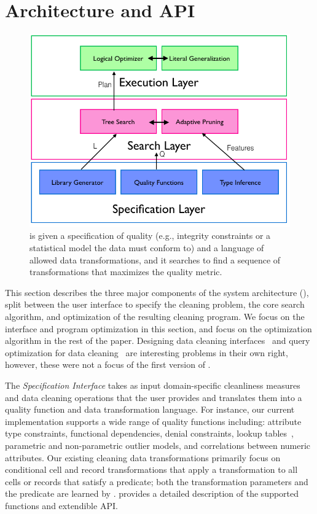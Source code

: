 \section{Architecture and API}
\begin{figure}[t]
\centering
 \includegraphics[width=\columnwidth]{figures/alphacleanarch.png}
 \caption{ \sys is given a specification of quality (e.g., integrity constraints or a statistical model the data must conform to) and a language  of  allowed  data  transformations,  and  it  searches  to find a sequence of transformations that maximizes the quality metric. \label{fig:arch} }
\end{figure}
This section describes the three major components of the \sys system architecture (), split between the user interface to specify the cleaning problem, the core search algorithm, and optimization of the resulting cleaning program.  We focus on the interface and program optimization in this section, and focus on the optimization algorithm in the rest of the paper. Designing data cleaning interfaces~\cite{DBLP:conf/uist/GuoKHH11} and query optimization for data cleaning~\cite{DBLP:conf/vldb/GalhardasFSSS01, khayyat2015bigdansing} are interesting problems in their own right, however, these were not a focus of the first version of \sys.  

The {\it Specification Interface} takes as input domain-specific cleanliness measures and data cleaning operations that the user provides  and translates them into a quality function and data transformation language.   For instance, our current implementation supports a wide range of quality functions including: attribute type constraints, functional dependencies, denial constraints, lookup tables~\cite{}, parametric and non-parametric outlier models, and correlations between numeric attributes.  Our existing cleaning data transformations primarily focus on conditional cell and record transformations that apply a transformation to all cells or records that satisfy a predicate; both the transformation parameters and the predicate are learned by \sys.   provides a detailed description of the supported functions and extendible API. 


